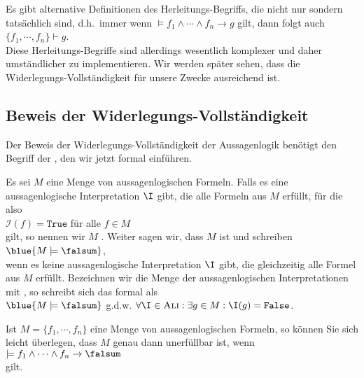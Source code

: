 \remark
Es gibt alternative Definitionen des Herleitungs-Begriffs, die nicht nur  sondern
tatsächlich  sind, d.h.~immer wenn $\models f_1 \wedge \cdots \wedge f_n \rightarrow g$ gilt,
dann folgt auch
\\[0.2cm]
\hspace*{1.3cm}
$\{ f_1, \cdots, f_n \} \vdash g$.
\\[0.2cm]  
Diese Herleitungs-Begriffe sind allerdings wesentlich komplexer und daher umständlicher zu implementieren.  Wir
werden später sehen, dass die Widerlegungs-Vollständigkeit für unsere Zwecke ausreichend ist.
\eox

\subsection{Beweis der Widerlegungs-Vollständigkeit}
Der Beweis der Widerlegungs-Vollständigkeit der Aussagenlogik benötigt den  Begriff der
, den wir jetzt formal einführen. 

\begin{Definition}[Erfüllbarkeit] 
  Es sei $M$ eine Menge von aussagenlogischen Formeln.
  Falls es eine aussagen\-logische Interpretation $\I$ gibt, die alle Formeln aus $M$ erfüllt, für die also
  \\[0.2cm]
  \hspace*{1.3cm}
  $\mathcal{I}(f) = \texttt{True}$ \quad für alle $f \in M$
  \\[0.2cm]
  gilt, so nennen wir $M$ .  Weiter sagen wir, dass $M$ 
  ist und schreiben 
  \\[0.2cm]
  \hspace*{1.3cm}
  $\blue{M \models \falsum}$, 
  \\[0.2cm]
  wenn es keine aussagenlogische Interpretation $\I$ gibt, die gleichzeitig alle Formel aus $M$ erfüllt.
  Be\-zeichnen wir die Menge der aussagenlogischen Interpretationen mit
  \textsc{}, so schreibt sich das formal als
  \\[0.2cm]
  \hspace*{1.3cm}
  $\blue{M \models \falsum}$ \quad g.d.w. \quad 
  $\forall \I \in \textsc{Ali}: \exists g \in M: \I(g) = \texttt{False}$.   
  \eox
\end{Definition}

\remark 
Ist $M = \{ f_1, \cdots, f_n \}$ eine Menge von aussagenlogischen Formeln, so können Sie sich leicht überlegen, dass
$M$ genau dann unerfüllbar ist, wenn
\\[0.2cm]
\hspace*{1.3cm}
$\models f_1 \wedge \cdots \wedge f_n \rightarrow \falsum$
\\[0.2cm]
gilt. \eox



